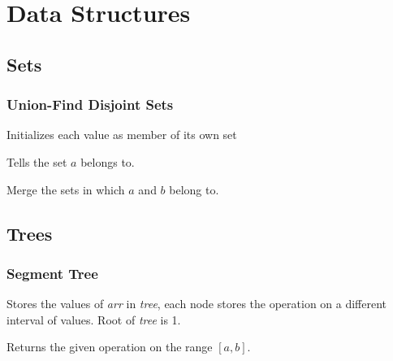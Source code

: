 \documentclass{article}
\begin{document}
\tableofcontents
\section{Data Structures}
\subsection{Sets}
\subsubsection{Union-Find Disjoint Sets}
\noindent\begin{minipage}{\linewidth}

\end{minipage}
Initializes each value as member of its own set

\noindent\begin{minipage}{\linewidth}

\end{minipage}
Tells the set $a$ belongs to.

\noindent\begin{minipage}{\linewidth}

\end{minipage}
Merge the sets in which $a$ and $b$ belong to.

\subsection{Trees}
\subsubsection{Segment Tree}

\noindent\begin{minipage}{\linewidth}

\end{minipage}
Stores the values of \textit{arr} in \textit{tree}, each node stores the
operation on a different interval of values. Root of \textit{tree} is 1.

\noindent\begin{minipage}{\linewidth}

\end{minipage}
Returns the given operation on the range $[a, b]$.
\end{document}
